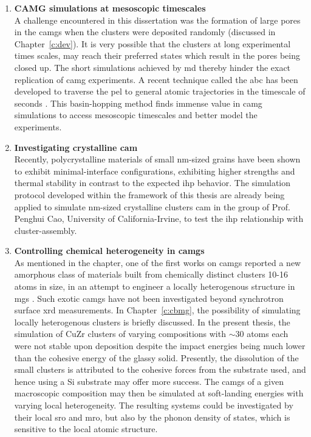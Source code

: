 \begin{enumerate}[leftmargin=*]
\item \textbf{CAMG simulations at mesoscopic timescales}\\
A challenge encountered in this dissertation was the formation of large pores in the \gls{camg}s when the clusters were deposited randomly (discussed in Chapter~\ref{c:dev}). It is very possible that the clusters at long experimental times scales, may reach their preferred states which result in the pores being closed up. The short simulations achieved by \gls{md} thereby hinder the exact replication of \gls{camg} experiments. A recent technique called the \gls{abc} has been developed to traverse the \gls{pel} to general atomic trajectories in the timescale of seconds \cite{Cao2012,Fan2018}. This basin-hopping method finds immense value in \gls{camg} simulations to access mesoscopic timescales and better model the experiments.

\item \textbf{Investigating crystalline \gls{cam}}\\
Recently, polycrystalline materials of small nm-sized grains have been shown to exhibit minimal-interface configurations, exhibiting higher strengths and thermal stability \cite{Li2020,Hu2022} in contrast to the expected \gls{ihp} behavior. The simulation protocol developed within the framework of this thesis are already being applied to simulate nm-sized crystalline clusters \gls{cam} in the group of Prof. Penghui Cao, University of California-Irvine, to test the \gls{ihp} relationship with cluster-assembly.

\item \textbf{Controlling chemical heterogeneity in \gls{camg}s}\\
As mentioned in the  chapter, one of the first works on \gls{camg}s reported a new amorphous class of materials built from chemically distinct clusters 10-16 atoms in size, in an attempt to engineer a locally heterogenous structure in \gls{mg}s \cite{Kartouzian2013,Kartouzian2014}. Such exotic \gls{camg}s have not been investigated beyond synchrotron surface \gls{xrd} measurements. In Chapter~\ref{c:cbmg}, the possibility of simulating locally heterogenous clusters is briefly discussed. In the present thesis, the simulation of CuZr clusters of varying compositions with $\sim$30 atoms each were not stable upon deposition despite the impact energies being much lower than the cohesive energy of the glassy solid. Presently, the dissolution of the small clusters is attributed to the cohesive forces from the \cz substrate used, and hence using a Si substrate may offer more success. The \gls{camg}s of a given macroscopic composition may then be simulated at soft-landing energies with varying local heterogeneity. The resulting systems could be investigated by their local \gls{sro} and \gls{mro}, but also by the phonon density of states, which is sensitive to the local atomic structure.




\end{enumerate}
